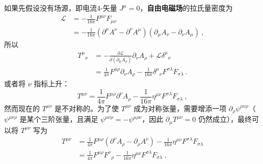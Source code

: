 如果先假设没有场源，即电流4-矢量 $J^\mu = 0$，\textbf{自由电磁场}的拉氏量密度为
\begin{equation}
\begin{aligned}
\mathcal{L}&=-\frac{1}{16\pi}F^{\mu\nu} F_{\mu\nu}\\
&=-\frac{1}{16\pi}(\partial^\mu A^\nu-\partial^\nu A^\mu)(\partial_\mu A_\nu-\partial_\nu A_\mu)~,
\end{aligned}
\end{equation}
所以
\begin{equation}
\begin{aligned}
T^\mu{}_\nu&=-\frac{\partial \mathcal{L}}{\partial (\partial_\mu A_\rho)}\partial_\nu A_\rho+\mathcal{L}\delta^\mu{}_\nu\\
&=\frac{1}{4\pi}F^{\mu\rho}\partial_\nu A_\rho-\frac{1}{16\pi}\delta^\mu{}_\nu F^{\sigma\lambda}F_{\sigma\lambda}~.
\end{aligned}
\end{equation}
或者将 $\nu$ 指标上升：
\begin{equation}
T^{\mu\nu}=\frac{1}{4\pi}F^{\mu\rho}\partial^\nu A_\rho - \frac{1}{16\pi} \eta^{\mu\nu}F^{\sigma\lambda}F_{\sigma\lambda}~,
\end{equation}
然而现在的 $T^{\mu\nu}$ 是不对称的。为了使 $T^{\mu\nu}$ 成为对称张量，需要增添一项 $\partial_\rho \psi^{\mu\nu\rho}$（$\psi^{\mu\nu\rho}$ 是某个三阶张量，且满足 $\psi^{\mu\nu\rho}=-\psi^{\mu\rho\nu}$，因此 $\partial_\mu T^{\mu\nu}=0$ 仍然成立），最终可以将 $T^{\mu\nu}$ 写为
\begin{equation}
\begin{aligned}
T^{\mu\nu}&=\frac{1}{4\pi}F^{\mu\rho}(\partial^\nu A_\rho-\partial_\rho A^\nu) - \frac{1}{16\pi} \eta^{\mu\nu}F^{\sigma\lambda}F_{\sigma\lambda}\\
&=\frac{1}{4\pi}F^{\mu\rho}F^\nu{}_\rho - \frac{1}{16\pi} \eta^{\mu\nu}F^{\sigma\lambda}F_{\sigma\lambda}~,
\end{aligned}
\end{equation}

